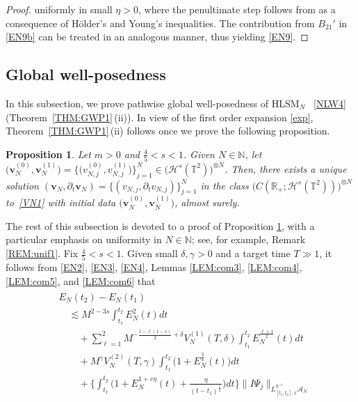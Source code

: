 \documentclass[letterpaper, 11pt,  reqno]{amsart}
\newtheorem{proposition}[theorem]{Proposition}
\newcommand{\1}{\hspace{0.5mm}\text{I}\hspace{0.2mm}}
\newcommand{\noi}{\noindent}
\newcommand{\R}{\mathbb{R}}
\newcommand{\T}{\mathbb{T}}
\newcommand{\N}{\mathbb{N}}
\renewcommand{\H}{\mathcal{H}}
\newcommand{\dl}{\delta}
\newcommand{\dt}{\partial_t}
\newcommand{\les}{\lesssim}
\newcommand{\g}{\gamma}
\newcommand{\A}{\mathcal{A}}
\newcommand{\HLS}{$\text{HLSM}_N$ }
\newcommand{\EN}{E_N}
\newcommand{\vv}{\mathbf{v}}
\renewcommand{\l}{\ell}
\numberwithin{equation}{section}
\numberwithin{theorem}{section}
\begin{document}
\begin{proof}
 \noi
uniformly in  small $ \eta > 0$, 
where the penultimate step follows from \cite[the math display before~(3.21)]{GKOT}
as a consequence of H\"older's and Young's inequalities.
The contribution from $B_{21}'$ in \eqref{EN9b}
can be treated in an analogous manner, 
thus yielding \eqref{EN9}.
\end{proof}







\subsection{Global well-posedness} 
\label{SUBSEC:3.3}



In this subsection, we prove
pathwise  global well-posedness of \HLS~\eqref{NLW4}
(Theorem~\ref{THM:GWP1}\,(ii)).
In view of the first order expansion \eqref{exp}, 
Theorem~\ref{THM:GWP1}\,(ii)
follows once we prove the following proposition.


 
\begin{proposition}
\label{PROP:GWP1}
Let $m > 0$ and $ \frac 45 < s < 1$.
Given $N \in \N$, 
let $\big(\vv_{N}^{(0)},  \vv_{N}^{(1)}\big) = \big\{\big(v_{N, j}^{(0)},  v_{N, j}^{(1)}\big)\big\}_{j = 1}^N \in \big(\H^s (\T^2)\big)^{\otimes N}$. Then, there exists a unique solution 
$(\vv_N, \dt \vv_N) = \{( v_{N, j}, \dt  v_{N, j} )\}_{j = 1}^N$
in the class
$\big(  C (\R_+; \H^s (\T^2) )\big)^{\otimes N}$
 to~\eqref{VN1} with initial data
$\big(\vv_{N}^{(0)},  \vv_{N}^{(1)}\big)$, 
almost surely.



\end{proposition}


The rest of this subsection is devoted to a proof of Proposition \ref{PROP:GWP1}, 
with a particular emphasis on uniformity in $N \in \N$;
see, for example, Remark \ref{REM:unif1}.
Fix $  \frac 45 < s < 1$.
Given small $\dl, \g > 0$ and a target time $T \gg1$, 
it follows from 
 \eqref{EN2}, \eqref{EN3}, \eqref{EN4}, Lemmas \ref{LEM:com3}, \ref{LEM:com4}, \ref{LEM:com5}, and \ref{LEM:com6}
 that 
\begin{align} 
\begin{split}
& \EN(t_2)  - \EN(t_1) \\
& \quad \les M^{2 - 3s} \int_{t_1}^{t_2} \EN^2 (t) d t \\ 
&\quad \quad 
+ \sum_{\l = 1}^2
M^{-  \frac {1 - \l(1-s)}2 +  \dl} 
V_N^{(1)} (T, \dl) \int_{t_1}^{t_2} \EN^\frac {\l + 1}2 (t)dt\\
&\quad \quad 
+ M^{\g} V_N^{(2)} (T, \g) \int_{t_1}^{t_2} \big(1 + \EN^\frac 34 (t)\big) d t 
\\
&\quad \quad 
+ \bigg\{\int_{t_1}^{t_2}  
\Big(1 + \EN^{1 + c\eta} (t) + \frac {\eta}{(t - t_1)^{\frac 12}} \Big)d t\bigg\}
\| I \Psi_j \|_{L^{\eta^{-1}}_{[t_1, t_2], x} \A_N } 
\end{split}
\label{EN10}
\end{align} 
\end{document}
